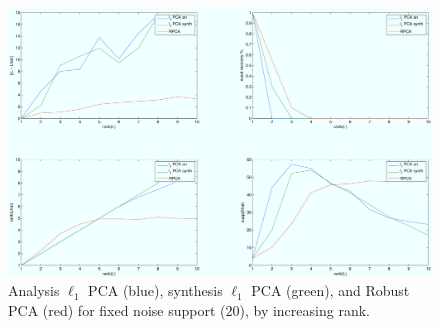 \begin{figure}[h!]
\centering
\includegraphics[width=\textwidth]{../figures/l1pca_10x10_support8_by_rank.pdf}
\caption{Analysis $\ell_1$ PCA (blue), synthesis $\ell_1$ PCA (green), and Robust PCA (red) for fixed noise support ($20$), by increasing rank.}
\label{fig:l1pca_by_rank}
\end{figure}

